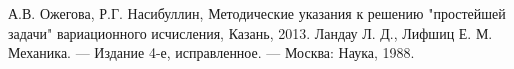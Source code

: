 \documentclass[12pt]{article}
\begin{document}
 	
 	
	\pagebreak
	\begin{thebibliography}{9} 
		А.В. Ожегова, Р.Г. Насибуллин, Методические указания к решению
		"простейшей задачи" вариационного
		исчисления, Казань, 2013. 
		 Ландау Л. Д., Лифшиц Е. М. Механика. — Издание 4-е, исправленное. — Москва: Наука, 1988.
	\end{thebibliography}
	
\end{document}
